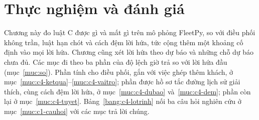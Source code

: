 
\chapter{Thực nghiệm và đánh giá}
\label{chuong:thucnghiem}

Chương này đo luật C được gì và mất gì trên mô phỏng FleetPy, so với điều phối không trần, luật hạn chót và cách đệm
lời hứa, tức cộng thêm một khoảng cố định vào mọi lời hứa. Chương cũng xét lời hứa theo dự báo và những chỗ dự báo
chưa đủ. Các mục đi theo ba phần của độ lệch giờ trả so với lời hứa đầu (mục~\ref{muc:so}). Phần tính cho điều phối,
gắn với việc ghép thêm khách, ở mục~\ref{muc:c4-ketqua}--\ref{muc:c4-vaitro}; phần được hồ sơ tắc đường lịch sử giải
thích, cùng cách đệm lời hứa, ở mục~\ref{muc:c4-dubao} và~\ref{muc:c4-dem}; phần còn lại ở mục~\ref{muc:c4-tuyet}.
Bảng~\ref{bang:c4-lotrinh} nối ba câu hỏi nghiên cứu ở mục~\ref{muc:c1-cauhoi} với các mục trả lời chúng.

